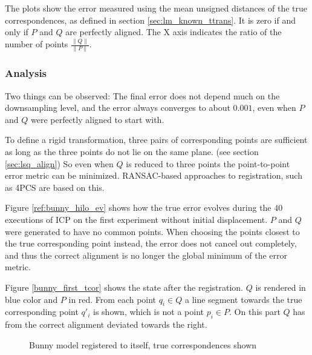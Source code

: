The plots show the error measured using the mean unsigned distances of the true correspondences, as defined in section \ref{sec:lm_known_ttrans}. It is zero if and only if $P$ and $Q$ are perfectly aligned. The X axis indicates the ratio of the number of points $\frac{\|Q\|}{\|P\|}$.


\subsubsection{Analysis}
Two things can be observed: The final error does not depend much on the downsampling level, and the error always converges to about $0.001$, even when $P$ and $Q$ were perfectly aligned to start with.

To define a rigid transformation, three pairs of corresponding points are sufficient as long as the three points do not lie on the same plane. (see section \ref{sec:lsq_align}) So even when $Q$ is reduced to three points the point-to-point error metric can be minimized. RANSAC-based approaches to registration, such as 4PCS are based on this.

Figure \ref{ref:bunny_hilo_ev} shows how the true error evolves during the $40$ executions of ICP on the first experiment without initial displacement. $P$ and $Q$ were generated to have no common points. When choosing the points closest to the true corresponding point instead, the error does not cancel out completely, and thus the correct alignment is no longer the global minimum of the error metric.

Figure \ref{bunny_first_tcor} shows the state after the registration. $Q$ is rendered in blue color and $P$ in red. From each point $q_i \in Q$ a line segment towards the true corresponding point $q'_i$ is shown, which is not a point $p_i \in P$. On this part $Q$ has from the correct alignment deviated towards the right.

\begin{figure}[p]
\centering
{
	\setlength{\fboxsep}{0pt}%
	\setlength{\fboxrule}{0.5pt}%
}
\caption{Bunny model registered to itself, true correspondences shown}
\label{fig:bunny_first_tcor}
\end{figure}

